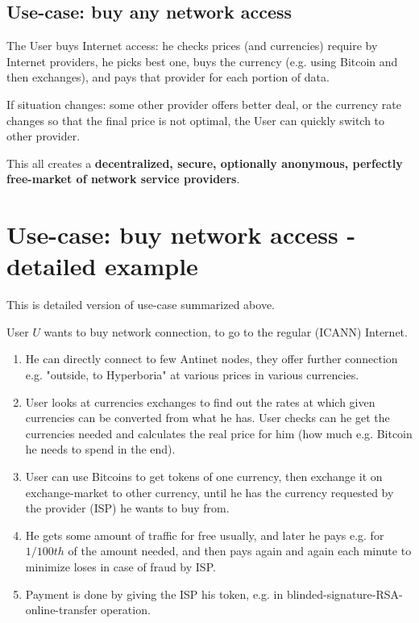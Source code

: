\documentclass[a4paper,11pt]{article}
\begin{document}
\subsection{Use-case: buy any network access}

The User buys Internet access: 
he checks prices (and currencies) require by Internet providers,
he picks best one,
buys the currency (e.g. using Bitcoin and then exchanges), and pays that provider for each portion of data.

If situation changes: some other provider offers better deal, or the currency rate changes so that the final price is not optimal, 
the User can quickly switch to other provider.

This all creates a \textbf{decentralized, secure, optionally anonymous, perfectly free-market of network service providers}.

\section{Use-case: buy network access - detailed example}

This is detailed version of use-case summarized above.

User $U$ wants to buy network connection, to go to the regular (ICANN) Internet.

\begin{enumerate}
  \item He can directly connect to few Antinet nodes, they offer further connection e.g. "outside, to Hyperboria" at various prices in various currencies.

  \item User looks at currencies exchanges to find out the rates at which given currencies can be converted from what he has. User checks can he get the currencies needed and calculates the real price for him (how much e.g. Bitcoin he needs to spend in the end).

  \item User can use Bitcoins to get tokens of one currency, then exchange it on exchange-market to other currency, until he has the currency requested by the provider (ISP) he wants to buy from.

  \item He gets some amount of traffic for free usually, and later he pays e.g. for $1/100th$ of the amount needed, and then pays again and again each minute to minimize loses in case of fraud by ISP.

  \item Payment is done by giving the ISP his token, e.g. in blinded-signature-RSA-online-transfer operation.
\end{enumerate}
\end{document}
